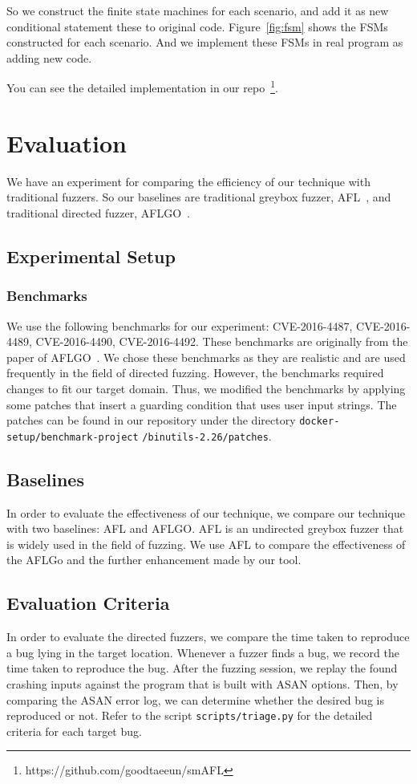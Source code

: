 \documentclass[12pt]{sigplanconf}
\begin{document}
So we construct the finite state machines for each scenario, and add it as new conditional statement these to original code.
Figure~\ref{fig:fsm} shows the FSMs constructed for each scenario. And we implement these FSMs in real program as adding
new code.

You can see the detailed implementation in our repo~\footnote{https://github.com/goodtaeeun/smAFL}.

\section{Evaluation}
\label{eval}
We have an experiment for comparing the efficiency of our technique with traditional fuzzers. So our baselines are traditional
greybox fuzzer, AFL~\cite{aflfuzz}, and traditional directed fuzzer, AFLGO~\cite{bohme:ccs:2017}.



\subsection{Experimental Setup}

\subsubsection{Benchmarks}
We use the following benchmarks for our experiment: CVE-2016-4487, CVE-2016-4489, CVE-2016-4490, CVE-2016-4492.
These benchmarks are originally from the paper of AFLGO~\cite{bohme:ccs:2017}.
We chose these benchmarks as they are realistic and are used frequently in the field of directed fuzzing.
However, the benchmarks required changes to fit our target domain.
Thus, we modified the benchmarks by applying some patches that insert a guarding condition that uses user input strings.
The patches can be found in our repository under the directory
\texttt{docker-setup/benchmark-project}
\texttt{/binutils-2.26/patches}.

\subsection{Baselines}
In order to evaluate the effectiveness of our technique, we compare our technique with two baselines: AFL and AFLGO.
AFL is an undirected greybox fuzzer that is widely used in the field of fuzzing. We use AFL to compare the effectiveness
of the AFLGo and the further enhancement made by our tool.

\subsection{Evaluation Criteria}
In order to evaluate the directed fuzzers, we compare the time taken to reproduce a bug lying in the target location.
Whenever a fuzzer finds a bug, we record the time taken to reproduce the bug.
After the fuzzing session, we replay the found crashing inputs against the program that is built with ASAN options.
Then, by comparing the ASAN error log, we can determine whether the desired bug is reproduced or not.
Refer to the script \texttt{scripts/triage.py} for the detailed criteria for each target bug.
\end{document}
